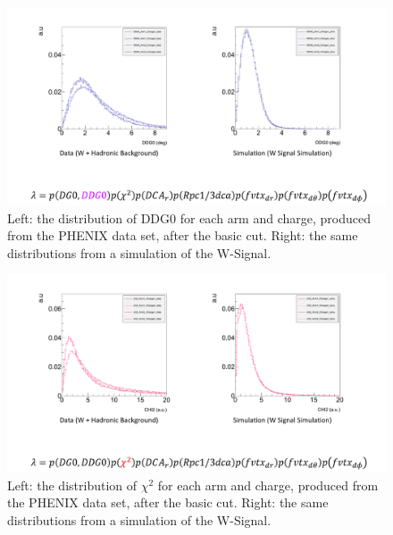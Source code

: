 \begin{figure}
  \centering
  \includegraphics[width=\linewidth,trim=4 4 4 4,clip]{./figures/pdf_DDG0.png}
  \caption{
    Left: the distribution of DDG0 for each arm and charge, produced from the
    PHENIX data set, after the basic cut. Right: the same distributions from a
    simulation of the W-Signal.
  }
  \label{fig:pdf_DDG0}
\end{figure}

\begin{figure}
  \centering
  \includegraphics[width=\linewidth,trim=4 4 4 4,clip]{./figures/pdf_chi2.png}
  \caption{
    Left: the distribution of $\chi^2$ for each arm and charge, produced from the
    PHENIX data set, after the basic cut. Right: the same distributions from a
    simulation of the W-Signal.
  }
  \label{fig:pdf_chi2}
\end{figure}

